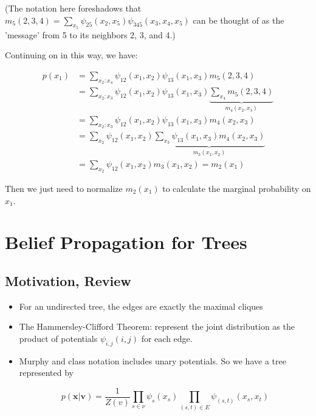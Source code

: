 \documentclass{harvardml}
\theoremstyle{definition}
\theoremstyle{plain}
\theoremstyle{definition}
\theoremstyle{remark}
\begin{document}
(The notation here foreshadows that $m_5(2,3,4) = \sum_{x_5}\psi_{25}(x_2, x_5)
\psi_{345}(x_3, x_4, x_5)$ can be thought of as the 'message' from 5 to its neighbors 2, 3, and 4.) 

Continuing on in this way, we have:

\begin{align*}
p(x_1) &= \sum_{x_2:x_4} \psi_{12}(x_1, x_2)
\psi_{13}(x_1, x_3)
m_5(2,3,4)\\
&= \sum_{x_2:x_3}\psi_{12}(x_1, x_2)
\psi_{13}(x_1, x_3)
\underbrace{\sum_{x_4}m_5(2,3,4)}_\text{$m_4(x_2, x_3)$}\\
&= \sum_{x_2: x_3}\psi_{12}(x_1, x_2)
\psi_{13}(x_1, x_3)m_4(x_2, x_3)\\
&= \sum_{x_2} \psi_{12}(x_1, x_2) \underbrace{\sum_{x_3} \psi_{13}(x_1, x_3)m_4(x_2, x_3)}_\text{$m_3(x_1, x_2)$}\\
&= \sum_{x_2} \psi_{12}(x_1, x_2)m_3(x_1, x_2) = m_2(x_1)
\end{align*}

Then we just need to normalize $m_2(x_1)$ to calculate the marginal probability on $x_1$.


\section{Belief Propagation for Trees}
\subsection{Motivation, Review}
\begin{itemize}
    \item  For an undirected tree, the edges are exactly the maximal cliques
    \item The Hammersley-Clifford Theorem: represent the joint distribution as the product of potentials $\psi_{i,j}(i,j)$ for each edge.
    \item Murphy and class notation includes unary potentials. So we have a tree represented by 
    
    $$p(\mathbf{x}|\mathbf{v}) = \frac{1}{Z(v)} \prod_{s \in \nu} \psi_s(x_s) \prod_{(s,t) \in E} \psi_{(s,t)}(x_s,x_t)$$
\end{itemize}
\end{document}
